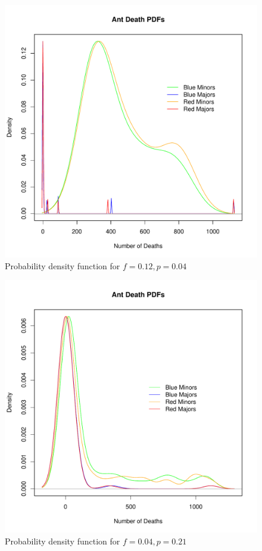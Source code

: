 \begin{enumerate}
\begin{figure}[h!]
\centering
\includegraphics[scale=0.80]{partb2v1.pdf}
\caption{Probability density function for $f = 0.12, p = 0.04$}
\label{partb2fig}
\end{figure}

\begin{figure}[h!]
\centering
\includegraphics[scale=0.80]{partb3v1.pdf}
\caption{Probability density function for $f = 0.04, p = 0.21$}
\label{partb3fig}
\end{figure}


\end{enumerate}
